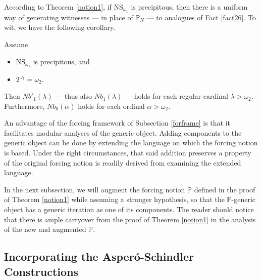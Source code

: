 \documentclass[12pt]{article}
\numberwithin{equation}{section}
\begin{document}
According to Theorem \ref{notion1}, if $\mathrm{NS}_{\omega_1}$ is precipitous, then there is a uniform way of generating witnesses --- in place of $\mathbb{P}_N$ --- to analogues of Fact \ref{fact26}. To wit, we have the following corollary.

\begin{cor}\label{nambacoro}
Assume 
\begin{itemize}
    \item $\mathrm{NS}_{\omega_1}$ is precipitous, and
    \item $2^{\omega_1} = \omega_2$.
\end{itemize}
Then $Nb'_1(\lambda)$ --- thus also $Nb_1(\lambda)$ --- holds for each regular cardinal $\lambda > \omega_2$. Furthermore, $Nb_0(\alpha)$ holds for each ordinal $\alpha > \omega_2$.
\end{cor}

An advantage of the forcing framework of Subsection \ref{forframe} is that it facilitates modular analyses of the generic object. Adding components to the generic object can be done by extending the language on which the forcing notion is based. Under the right circumstances, that said addition preserves a property of the original forcing notion is readily derived from examining the extended language.

In the next subsection, we will augment the forcing notion $\mathbb{P}$ defined in the proof of Theorem \ref{notion1} while assuming a stronger hypothesis, so that the $\mathbb{P}$-generic object has a generic iteration as one of its components. The reader should notice that there is ample carryover from the proof of Theorem \ref{notion1} in the analysis of the new and augmented $\mathbb{P}$.

\subsection{Incorporating the Asper\'{o}-Schindler Constructions}\label{ss43}
\end{document}
